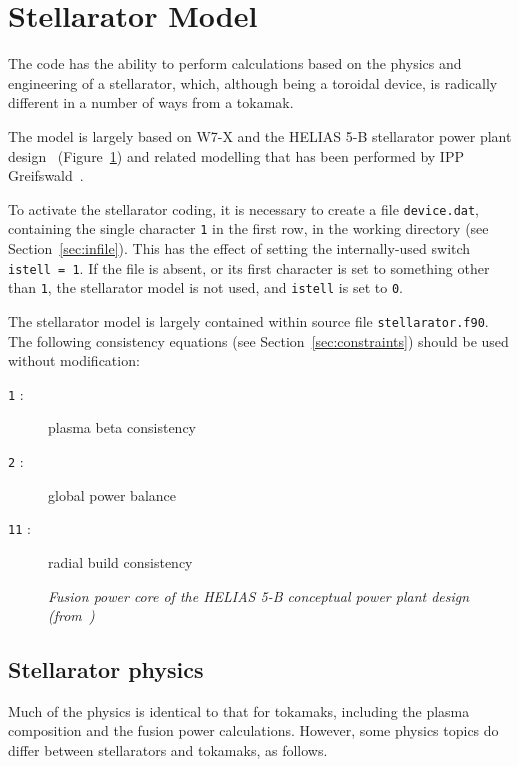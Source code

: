 \documentclass[11pt,a4paper]{report}
\begin{document}
\section{Stellarator Model}

The code has the ability to perform calculations based on the physics and
engineering of a stellarator, which, although being a toroidal device, is
radically different in a number of ways from a tokamak.

The model is largely based on W7-X and the HELIAS 5-B stellarator power plant
design~\cite{helias5b} (Figure~\ref{fig:helias5b}) and related modelling that
has been performed by IPP Greifswald~\cite{stell_geometry, stell_divertor,
  stell_coil}.

To activate the stellarator coding, it is necessary to create a file
\texttt{device.dat}, containing the single character \texttt{1} in the first
row, in the working directory (see Section~\ref{sec:infile}). This has the
effect of setting the internally-used switch \texttt{istell = 1}. If the file
is absent, or its first character is set to something other than \texttt{1},
the stellarator model is not used, and \texttt{istell} is set to
\texttt{0}.

The stellarator model is largely contained within source file
\texttt{stellarator.f90}. The following consistency equations (see
Section~\ref{sec:constraints}) should be used without modification:
\begin{description}
\item [\texttt{1} :] plasma beta consistency
\item [\texttt{2} :] global power balance
\item [\texttt{11} :] radial build consistency
\end{description}

\begin{figure}[tbph]
\centerline{}
\caption[HELIAS 5-B Stellarator Power Plant Design]
{\label{fig:helias5b}
  \textit{Fusion power core of the HELIAS 5-B conceptual power plant design
    (from~\cite{helias5b})}
}
\end{figure}

\subsection{Stellarator physics}

Much of the physics is identical to that for tokamaks, including the plasma
composition and the fusion power calculations. However, some physics topics do
differ between stellarators and tokamaks, as follows.
\end{document}
